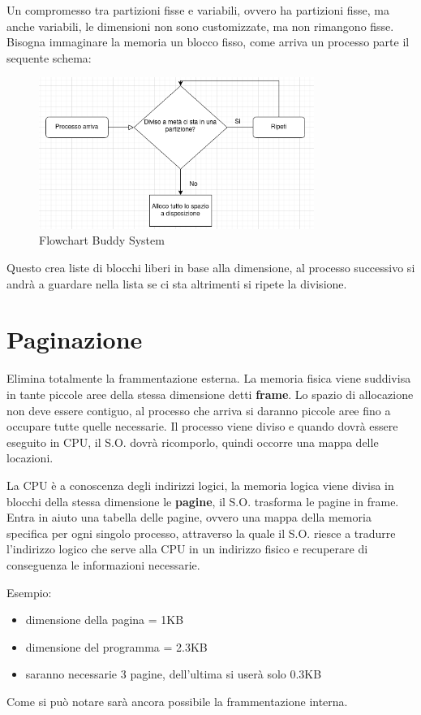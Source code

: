 \documentclass[a4paper, 12pt]{book}
\begin{document}
Un compromesso tra partizioni fisse e variabili, ovvero
ha partizioni fisse, ma anche variabili, le dimensioni 
non sono customizzate, ma non rimangono fisse. Bisogna 
immaginare la memoria un blocco fisso, come arriva un
processo parte il sequente schema:  

\begin{figure}
    \includegraphics[width=0.8\textwidth]{buddy_system.png}
    \caption{Flowchart Buddy System}
\end{figure}

Questo crea liste di blocchi liberi in base alla dimensione,
al processo successivo si andrà a guardare nella lista
se ci sta altrimenti si ripete la divisione.

\section{Paginazione}

Elimina totalmente la frammentazione esterna. La memoria fisica
viene suddivisa in tante piccole aree della stessa dimensione detti \textbf{frame}.
Lo spazio di allocazione non deve essere contiguo, al processo 
che arriva si daranno piccole aree fino a occupare tutte 
quelle necessarie. Il processo viene diviso
e quando dovrà essere eseguito in CPU, il S.O. dovrà
ricomporlo, quindi occorre una mappa delle locazioni.

La CPU è a conoscenza degli indirizzi logici, la memoria
logica viene divisa in blocchi della stessa dimensione le \textbf{pagine}, il S.O. 
trasforma le pagine in frame.
Entra in aiuto una tabella delle pagine, ovvero una mappa
della memoria specifica per ogni singolo processo, attraverso
la quale il S.O. riesce a tradurre l'indirizzo logico che serve alla 
CPU in un indirizzo fisico e recuperare di conseguenza le 
informazioni necessarie.

Esempio:
\begin{itemize}
    \item dimensione della pagina = 1KB
    \item dimensione del programma = 2.3KB
    \item saranno necessarie 3 pagine, dell'ultima si userà solo 0.3KB
\end{itemize}
Come si può notare sarà ancora possibile la frammentazione
interna.
\end{document}
